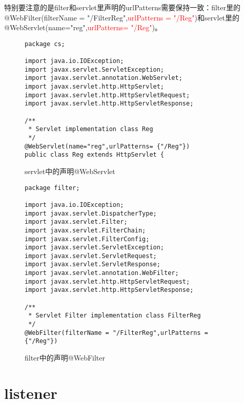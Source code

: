 特别要注意的是filter和servlet里声明的urlPatterns需要保持一致：filter里的@WebFilter(filterName = "/FilterReg",\textcolor{red}{urlPatterns = {"/Reg"}})和servlet里的@WebServlet(name="reg",\textcolor{red}{urlPatterns= {"/Reg"}})。
\begin{figure}
\begin{lstlisting}
package cs;

import java.io.IOException;
import javax.servlet.ServletException;
import javax.servlet.annotation.WebServlet;
import javax.servlet.http.HttpServlet;
import javax.servlet.http.HttpServletRequest;
import javax.servlet.http.HttpServletResponse;

/**
 * Servlet implementation class Reg
 */
@WebServlet(name="reg",urlPatterns= {"/Reg"})
public class Reg extends HttpServlet {
\end{lstlisting}
\caption{servlet中的声明@WebServlet}
\label{webServlet}
\end{figure}
\begin{figure}
\begin{lstlisting}
package filter;

import java.io.IOException;
import javax.servlet.DispatcherType;
import javax.servlet.Filter;
import javax.servlet.FilterChain;
import javax.servlet.FilterConfig;
import javax.servlet.ServletException;
import javax.servlet.ServletRequest;
import javax.servlet.ServletResponse;
import javax.servlet.annotation.WebFilter;
import javax.servlet.http.HttpServletRequest;
import javax.servlet.http.HttpServletResponse;

/**
 * Servlet Filter implementation class FilterReg
 */
@WebFilter(filterName = "/FilterReg",urlPatterns = {"/Reg"})
\end{lstlisting}
\caption{filter中的声明@WebFilter}
\label{webFilter}
\end{figure}

\section{listener}